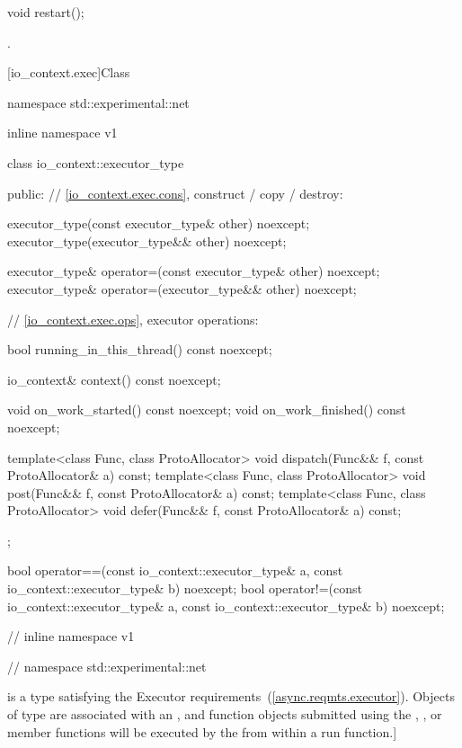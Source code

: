 %
\begin{itemdecl}
void restart();
\end{itemdecl}

\begin{itemdescr}
\pnum
\postconditions {}.
\end{itemdescr}




[io_context.exec]{Class }

%
\begin{codeblock}
namespace std::experimental::net {
inline namespace v1 {

  class io_context::executor_type
  {
  public:
    // \ref{io_context.exec.cons}, construct / copy / destroy:

    executor_type(const executor_type& other) noexcept;
    executor_type(executor_type&& other) noexcept;

    executor_type& operator=(const executor_type& other) noexcept;
    executor_type& operator=(executor_type&& other) noexcept;

    // \ref{io_context.exec.ops}, executor operations:

    bool running_in_this_thread() const noexcept;

    io_context& context() const noexcept;

    void on_work_started() const noexcept;
    void on_work_finished() const noexcept;

    template<class Func, class ProtoAllocator>
      void dispatch(Func&& f, const ProtoAllocator& a) const;
    template<class Func, class ProtoAllocator>
      void post(Func&& f, const ProtoAllocator& a) const;
    template<class Func, class ProtoAllocator>
      void defer(Func&& f, const ProtoAllocator& a) const;
  };

  bool operator==(const io_context::executor_type& a,
                  const io_context::executor_type& b) noexcept;
  bool operator!=(const io_context::executor_type& a,
                  const io_context::executor_type& b) noexcept;

} // inline namespace v1
} // namespace std::experimental::net
\end{codeblock}

\pnum
{} is a type satisfying the Executor requirements~(\ref{async.reqmts.executor}). Objects of type  are associated with an , and function objects submitted using the , , or  member functions will be executed by the  from within a run function.]


